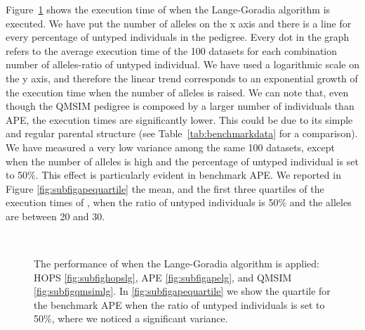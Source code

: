 Figure~\ref{fig:celer-lg} shows the execution time of {} when the
Lange-Goradia algorithm is executed. We have put the number of alleles on the x
axis and there is a line for every percentage of untyped individuals in the
pedigree. Every dot in the graph refers to the average execution time of the 100
datasets for each combination number of alleles-ratio of untyped individual. We
have used a logarithmic scale on the y axis, and therefore the linear trend
corresponds to an exponential growth of the execution time when the number of
alleles is raised. We can note that, even though the QMSIM pedigree is composed
by a larger number of individuals than APE, the execution times are
significantly lower. This could be due to its simple and regular parental
structure (see Table~\ref{tab:benchmarkdata} for a comparison). We have measured
a very low variance among the same 100 datasets, except when the number of
alleles is high and the percentage of untyped individual is set to 50\%. This
effect is particularly evident in benchmark APE. We reported in Figure
\ref{fig:subfigapequartile} the mean, and the first three quartiles of the
execution times of {}, when the ratio of untyped individuals is 50\%
and the alleles are between 20 and 30.

\begin{figure}
  \centering
  \\
  \caption{The performance of {} when the Lange-Goradia algorithm is
    applied: HOPS \ref{fig:subfighopslg}, APE \ref{fig:subfigapelg}, and QMSIM
    \ref{fig:subfigqmsimlg}. In \ref{fig:subfigapequartile} we show the quartile
  for the benchmark APE when the ratio of untyped individuals is set to 50\%,
  where we noticed a significant variance.}
  \label{fig:celer-lg}
\end{figure}


